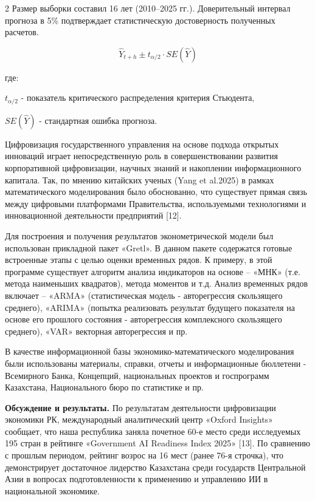 \begin{multicols}{2}
Размер выборки составил 16 лет (2010--2025 гг.). Доверительный интервал
прогноза в 5\% подтверждает статистическую достоверность полученных
расчетов.

\begin{equation}
\hat{Y}_{t+h} \pm t_{\alpha/2} \cdot SE(\hat{Y})
\end{equation}

где:

\(t_{\alpha/2}\) - показатель критического распределения критерия
Стьюдента,

\(SE(\hat{Y})\) - стандартная ошибка прогноза.

Цифровизация государственного управления на основе подхода открытых
инноваций играет непосредственную роль в совершенствовании развития
корпоративной цифровизации, научных знаний и накоплении информационного
капитала. Так, по мнению китайских ученых (Yang et al.2025) в рамках
математического моделирования было обоснованно, что существует прямая
связь между цифровыми платформами Правительства, используемыми
технологиями и инновационной деятельности предприятий {[}12{]}.

Для построения и получения результатов эконометрической модели был
использован прикладной пакет «Gretl». В данном пакете содержатся готовые
встроенные этапы с целью оценки временных рядов. К примеру, в этой
программе существует алгоритм анализа индикаторов на основе -- «МНК»
(т.е. метода наименьших квадратов), метода моментов и т.д. Анализ
временных рядов включает -- «ARMA» (статистическая модель -
авторегрессия скользящего среднего), «ARIMA» (попытка реализовать
результат будущего показателя на основе его прошлого состояния -
авторегрессия комплексного скользящего среднего), «VAR» векторная
авторегрессия и пр.

В качестве информационной базы экономико-математического моделирования
были использованы материалы, справки, отчеты и информационные бюллетени
- Всемирного Банка, Концепций, национальных проектов и госпрограмм
Казахстана, Национального бюро по статистике и пр.

{\bfseries Обсуждение и результаты.} По результатам деятельности
цифровизации экономики РК, международный аналитический центр «Oxford
Insights» сообщает, что наша республика заняла почетное 60-е место среди
исследуемых 195 стран в рейтинге «Government AI Readiness Index 2025»
{[}13{]}. По сравнению с прошлым периодом, рейтинг возрос на 16 мест
(ранее 76-я строчка), что демонстрирует достаточное лидерство Казахстана
среди государств Центральной Азии в вопросах подготовленности к
применению и управлению ИИ в национальной экономике.


\end{multicols}
